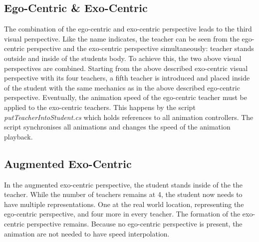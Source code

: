 \subsection{Ego-Centric \& Exo-Centric}
The combination of the ego-centric and exo-centric perspective leads to the third visual perspective. Like the name indicates, the teacher can be seen from the ego-centric perspective and the exo-centric perspective simultaneously: teacher stands outside and inside of the students body. To achieve this, the two above visual perspectives are combined. Starting from the above described exo-centric visual perspective with its four teachers, a fifth teacher is introduced and placed inside of the student with the same mechanics as in the above described ego-centric perspective. Eventually, the animation speed of the ego-centric teacher must be applied to the exo-centric teachers. This happens by the script \textit{putTeacherIntoStudent.cs} which holds references to all animation controllers. The script synchronises all animations and changes the speed of the animation playback. %
\subsection{Augmented Exo-Centric}
In the augmented exo-centric perspective, the student stands inside of the the teacher. While the number of teachers remains at 4, the student now needs to have multiple representations. One at the real world location, representing the ego-centric perspective, and four more in every teacher. The formation of the exo-centric perspective remains. Because no ego-centric perspective is present, the animation are not needed to have speed interpolation.

